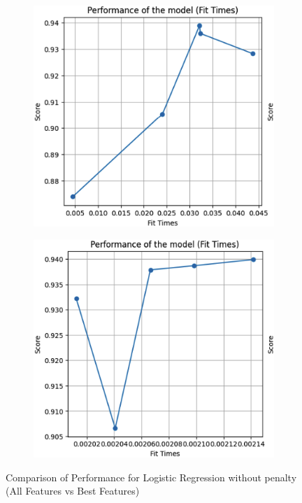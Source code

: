 \documentclass[conference]{IEEEtran}
\begin{document}
\begin{figure}[htbp]
    \centering
    \begin{subfigure}[b]{0.45\linewidth}
        \centering
        \includegraphics[width=\linewidth]{images/PerformanceNoPenaltyAllFeatures.png}
        \label{fig:performance-all}
    \end{subfigure}
    \hfill
    \begin{subfigure}[b]{0.45\linewidth}
        \centering
        \includegraphics[width=\linewidth]{images/PerformanceNoPenaltyBestFeatures.png}
        \label{fig:performance-best}
    \end{subfigure}
    \caption{Comparison of Performance for Logistic Regression without penalty (All Features vs Best Features)}
    \label{fig:performance-comparison}
\end{figure}
\end{document}
